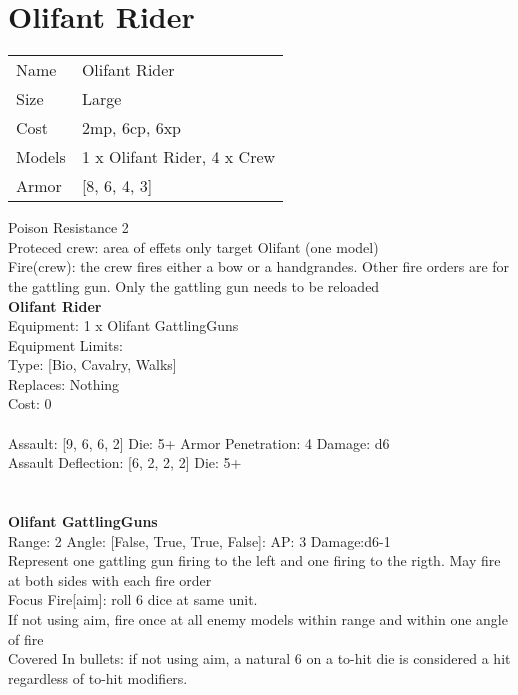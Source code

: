 \pagebreak\pagebreak

\section{ Olifant Rider }

\begin{tabular}{ll}
  Name & Olifant Rider \\
  Size & Large\\
  Cost & 2mp, 6cp, 6xp\\
  Models & 1 x Olifant Rider, 4 x Crew\\
  Armor & [8, 6, 4, 3]\\
\end{tabular}

\noindent Poison Resistance 2\\ 
Proteced crew: area of effets only target Olifant (one model)\\ 
Fire(crew): the crew fires either a bow or a handgrandes. Other fire orders are for the gattling gun. Only the gattling gun needs to be reloaded\\ 


{\bf Olifant Rider } \\
Equipment: 1 x Olifant GattlingGuns \\
Equipment Limits:  \\
Type: [Bio, Cavalry, Walks] \\
Replaces: Nothing \\
Cost: 0\\
\ \\
Assault: [9, 6, 6, 2] Die: 5+ Armor Penetration: 4 Damage: d6 \\
Assault Deflection: [6, 2, 2, 2] Die: 5+\\
\indent  
\ \\

\ \\
{\bf Olifant GattlingGuns } \\



Range: 2  Angle: [False, True, True, False]: AP: 3 Damage:d6-1 \\
Represent one gattling gun firing to the left and one firing to the rigth. May fire at both sides with each fire order\\ 
Focus Fire[aim]: roll 6 dice at same unit.\\ 
If not using aim, fire once at all enemy models within range and within one angle of fire\\ 
Covered In bullets: if not using aim, a natural 6 on a to-hit die is considered a hit regardless of to-hit modifiers.\\ 




